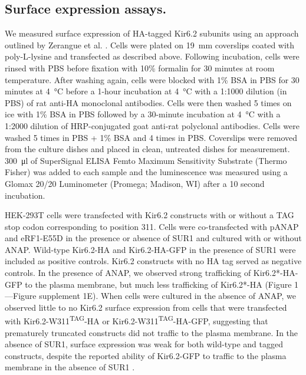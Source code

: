 \documentclass[10pt,lineno, doublespacing]{elife}
\begin{document}
\subsection{Surface expression assays.}
We measured surface expression of HA-tagged Kir6.2 subunits using an approach outlined by Zerangue et al. \citep{RN38, RN80}.
Cells were plated on \SI{19}{\milli\metre} coverslips coated with poly-L-lysine and transfected as described above.
Following incubation, cells were rinsed with PBS before fixation with 10\% formalin for 30 minutes at room temperature.
After washing again, cells were blocked with 1\% BSA in PBS for 30 minutes at \SI{4}{\degreeCelsius} before a 1-hour incubation at \SI{4}{\degreeCelsius} with a 1:1000 dilution (in PBS) of rat anti-HA monoclonal antibodies.
Cells were then washed 5 times on ice with 1\% BSA in PBS followed by a 30-minute incubation at \SI{4}{\degreeCelsius} with a 1:2000 dilution of HRP-conjugated goat anti-rat polyclonal antibodies.
Cells were washed 5 times in PBS + 1\% BSA and 4 times in PBS.
Coverslips were removed from the culture dishes and placed in clean, untreated dishes for measurement.
\SI{300}{\micro\litre} of SuperSignal ELISA Femto Maximum Sensitivity Substrate (Thermo Fisher) was added to each sample and the luminescence was measured using a Glomax 20/20 Luminometer (Promega; Madison, WI) after a 10 second incubation.

HEK-293T cells were transfected with Kir6.2 constructs with or without a TAG stop codon corresponding to position 311.
Cells were co-transfected with pANAP and eRF1-E55D in the presence or absence of SUR1 and cultured with or without ANAP.
Wild-type Kir6.2-HA and Kir6.2-HA-GFP in the presence of SUR1 were included as positive controls.
Kir6.2 constructs with no HA tag served as negative controls.
In the presence of ANAP, we observed strong trafficking of Kir6.2*-HA-GFP to the plasma membrane, but much less trafficking of Kir6.2*-HA (Figure 1—Figure supplement 1E).
When cells were cultured in the absence of ANAP, we observed little to no Kir6.2 surface expression from cells that were transfected with Kir6.2-W311\textsuperscript{TAG}-HA or Kir6.2-W311\textsuperscript{TAG}-HA-GFP, suggesting that prematurely truncated constructs did not traffic to the plasma membrane.
In the absence of SUR1, surface expression was weak for both wild-type and tagged constructs, despite the reported ability of Kir6.2-GFP to traffic to the plasma membrane in the absence of SUR1 \citep{RN86, RN48}.
\end{document}
